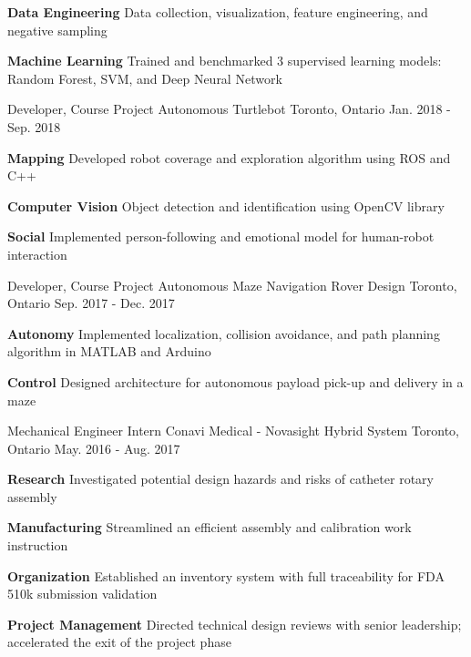 \begin{cventries}
{\begin{cvitems}
			\item {\textbf{Data Engineering} Data collection, visualization, feature engineering, and negative sampling}
			\item {\textbf{Machine Learning} Trained and benchmarked 3 supervised learning models: Random Forest, SVM, and Deep Neural Network}
		\end{cvitems}
	}
	\cventry
	{Developer, Course Project}
	{Autonomous Turtlebot}
	{Toronto, Ontario}
	{Jan. 2018 - Sep. 2018}
	{
		\begin{cvitems}
			\item {\textbf{Mapping} Developed robot coverage and exploration algorithm using ROS and C++}
			\item {\textbf{Computer Vision} Object detection and identification using OpenCV library}
			\item {\textbf{Social} Implemented person-following and emotional model for human-robot interaction}
		\end{cvitems}
	}
	\cventry
	{Developer, Course Project}
	{Autonomous Maze Navigation Rover Design}
	{Toronto, Ontario}
	{Sep. 2017 - Dec. 2017}
	{
		\begin{cvitems}
			\item { \textbf{Autonomy} Implemented localization, collision avoidance, and path planning algorithm in MATLAB and Arduino}
			\item { \textbf{Control} Designed architecture for autonomous payload pick-up and delivery in a maze}
		\end{cvitems}
	}
	\cventry
	{Mechanical Engineer Intern}
	{Conavi Medical - Novasight Hybrid System} 
	{Toronto, Ontario}
	{May. 2016 - Aug. 2017}
	{
		\begin{cvitems}
			\item {
				\textbf{Research} Investigated potential design hazards and risks of catheter rotary assembly
			}
			\item {
				\textbf{Manufacturing} Streamlined an efficient assembly and calibration work instruction}
			\item {
				\textbf{Organization} Established an inventory system with full traceability for FDA 510k submission validation}
			\item {
				\textbf{Project Management} Directed technical design reviews with senior leadership; accelerated the exit of the project phase}
		\end{cvitems}
	}  
\end{cventries}
